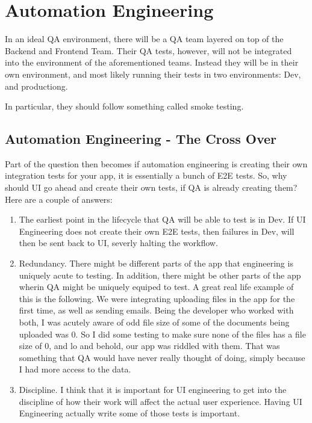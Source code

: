
\section{ Automation Engineering }

In an ideal QA environment, there will be a QA team layered on top of the
Backend and Frontend Team. Their QA tests, however, will not be integrated into
the environment of the aforementioned teams. Instead they will be in their own
environment, and most likely running their tests in two environments: Dev, and
productiong.

In particular, they should follow something called smoke testing.


\subsection{ Automation Engineering - The Cross Over }
Part of the question then becomes if automation engineering is creating their
own integration tests for your app, it is essentially a bunch of E2E tests. So,
why should UI go ahead and create their own tests, if QA is already creating
them? Here are a couple of answers:
\begin{enumerate}
  \item The earliest point in the lifecycle that QA will be able to test is in
  Dev. If UI Engineering does not create their own E2E tests, then failures in
  Dev, will then be sent back to UI, severly halting the workflow.
  \item Redundancy. There might be different parts of the app that engineering
  is uniquely acute to testing. In addition, there might be other parts of the
  app wherin QA might be uniquely equiped to test. A great real life example of
  this is the following. We were integrating uploading files in the app for the
  first time, as well as sending emails. Being the developer who worked with
  both, I was acutely aware of odd file size of some of the documents being
  uploaded was 0. So I did some testing to make sure none of the files has a
  file size of 0, and lo and behold, our app was riddled with them. That was
  something that QA would have never really thought of doing, simply because I
  had more access to the data.
  \item Discipline. I think that it is important for UI engineering to get into
  the discipline of how their work will affect the actual user experience.
  Having UI Engineering actually write some of those tests is important.
\end{enumerate}

